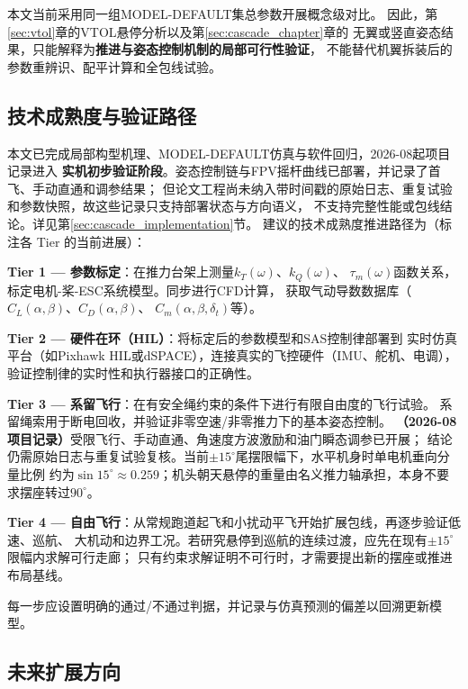 本文当前采用同一组\mbox{MODEL-DEFAULT}集总参数开展概念级对比。
因此，第\ref{sec:vtol}章的VTOL悬停分析以及第\ref{sec:cascade_chapter}章的
无翼或竖直姿态结果，只能解释为\textbf{推进与姿态控制机制的局部可行性验证}，
不能替代机翼拆装后的参数重辨识、配平计算和全包线试验。

\subsection{技术成熟度与验证路径}
\label{sec:verification}

本文已完成局部构型机理、MODEL-DEFAULT仿真与软件回归，2026-08起项目记录进入
\textbf{实机初步验证阶段}。姿态控制链与FPV摇杆曲线已部署，并记录了首飞、手动直通和调参结果；
但论文工程尚未纳入带时间戳的原始日志、重复试验和参数快照，故这些记录只支持部署状态与方向语义，
不支持完整性能或包线结论。详见第\ref{sec:cascade_implementation}节。
建议的技术成熟度推进路径为（标注各 Tier 的当前进展）：

\textbf{Tier 1 — 参数标定}：在推力台架上测量$k_T(\omega)$、$k_Q(\omega)$、
$\tau_m(\omega)$函数关系，标定电机-桨-ESC系统模型。同步进行CFD计算，
获取气动导数数据库（$C_L(\alpha,\beta)$、$C_D(\alpha,\beta)$、
$C_m(\alpha,\beta,\delta_t)$等）。

\textbf{Tier 2 — 硬件在环（HIL）}：将标定后的参数模型和SAS控制律部署到
实时仿真平台（如Pixhawk HIL或dSPACE），连接真实的飞控硬件（IMU、舵机、电调），
验证控制律的实时性和执行器接口的正确性。

\textbf{Tier 3 — 系留飞行}：在有安全绳约束的条件下进行有限自由度的飞行试验。
系留绳索用于断电回收，并验证非零空速/非零推力下的基本姿态控制。
\textbf{（2026-08项目记录）}受限飞行、手动直通、角速度方波激励和油门瞬态调参已开展；
结论仍需原始日志与重复试验复核。当前$\pm15^\circ$尾摆限幅下，水平机身时单电机垂向分量比例
约为$\sin15^\circ\approx0.259$；机头朝天悬停的重量由名义推力轴承担，本身不要求摆座转过$90^\circ$。

\textbf{Tier 4 — 自由飞行}：从常规跑道起飞和小扰动平飞开始扩展包线，再逐步验证低速、巡航、
大机动和边界工况。若研究悬停到巡航的连续过渡，应先在现有$\pm15^\circ$限幅内求解可行走廊；
只有约束求解证明不可行时，才需要提出新的摆座或推进布局基线。

每一步应设置明确的通过/不通过判据，并记录与仿真预测的偏差以回溯更新模型。

\subsection{未来扩展方向}

